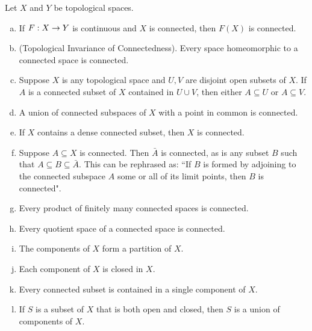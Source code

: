 \documentclass[11pt,a4paper]{article}
\begin{document}
\begin{proposition}\label{prop:connectedness}
Let $X$ and $Y$ be topological spaces.
\begin{enumerate}[(a)]
    \item If $F:X\rightarrow Y$ is continuous and $X$ is connected, then $F(X)$ is connected.\label{prop:connectedness_a}
    \item {(Topological Invariance of Connectedness).} Every space homeomorphic to a connected space is connected.\label{prop:connectedness_b}
    \item Suppose $X$ is any topological space and $U, V$ are disjoint open subsets of $X$. If $A$ is a connected subset of $X$ contained in $U\cup V$, then either $A\subseteq U$ or $A\subseteq V$.\label{prop:connectedness_c}
    \item A union of connected subspaces of $X$ with a point in common is connected.\label{prop:connectedness_d}
    \item If $X$ contains a dense connected subset, then $X$ is connected.\label{prop:connectedness_e}
    \item Suppose $A\subseteq X$ is connected. Then $\bar{A}$ is connected, as is any subset $B$ such that $A\subseteq B\subseteq \bar{A}$. This can be rephrased as: ``If $B$ is formed by adjoining to the connected subspace $A$ some or all of its limit points, then $B$ is connected".\label{prop:connectedness_f}
    \item Every product of finitely many connected spaces is connected.\label{prop:connectedness_g}
    \item Every quotient space of a connected space is connected.\label{prop:connectedness_h}
    \item The components of $X$ form a partition of $X$.\label{prop:connectedness_i}
    \item Each component of $X$ is closed in $X$.\label{prop:connectedness_j}
    \item Every connected subset is contained in a single component of $X$.\label{prop:connectedness_k}
    \item If $S$ is a subset of $X$ that is both open and closed, then $S$ is a union of components of $X$.\label{prop:connectedness_l}
\end{enumerate}
\end{proposition}
\end{document}

